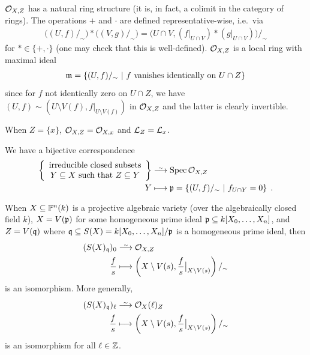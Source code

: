 \documentclass[a4paper,parskip=half,numbers=enddot, DIV=12]{scrreprt}
\begin{document}
    $\mathcal{O}_{X,Z}$ has a natural ring structure (it is, in fact, a colimit in the category of rings). The operations $+$ and $\cdot$ are defined representative-wise, i.e.\ via 
    \begin{align*}
        \big((U,f)/_\sim\big) * \big((V,g)/_\sim\big) = \big(U\cap V, (f|_{U\cap V})* (g|_{U\cap V})\big)/_\sim
    \end{align*}
    for $*\in\{+,\cdot\}$ (one may check that this is well-defined). $\mathcal{O}_{X,Z}$ is a local ring with maximal ideal
    \begin{align*}
        \mathfrak{m} = \left\{(U,f)/_\sim \ \middle|\  f\text{ vanishes identically on }U\cap Z\right\}
    \end{align*}
    since for $f$ not identically zero on $U\cap Z$, we have $(U,f)\sim\left(U\setminus V(f),f|_{U\setminus V(f)}\right)$ in $\mathcal{O}_{X,Z}$ and the latter is clearly invertible.
\begin{prop}
    \begin{alphanumerate}
    \item {}
        When $Z=\{x\}$, $\mathcal{O}_{X,Z} = \mathcal{O}_{X,x}$ and $\mathcal{L}_Z = \mathcal{L}_x$.
    \item   
	    We have a bijective correspondence
        \begin{align*}
	        \left\{
	        \begin{array}{c}
		        \text{irreducible closed subsets}\\
		        Y\subseteq X\text{ such that }Z\subseteq Y
	        \end{array}\right\}&\isomorphism\Spec \Oo_{X,Z}\\
            Y&\longmapsto \pp = \left\{(U,f)/_\sim\st f_{U\cap Y} = 0\right\}\;.
        \end{align*}
    \item 
        When $X\subseteq \mathbb{P}^n(k)$ is a projective algebraic variety (over the algebraically closed field $k$), $X=V(\mathfrak{p})$ for some homogeneous prime ideal $\mathfrak{p}\subseteq k[X_0,\ldots,X_n]$, and $Z= V(\mathfrak{q})$ where $\mathfrak{q}\subseteq S(X) = k[X_0,\ldots, X_n]/\mathfrak{p}$ is a homogeneous prime ideal, then
        \begin{align*}
            (S(X)_\qq)_0 &\isomorphism \Oo_{X,Z}\\
            \frac{f}{s} &\longmapsto \left(X\setminus V(s) , \frac{f}{s}\big|_{X\setminus V(s)}\right)/_\sim
           \end{align*}
           is an isomorphism. More generally,
           \begin{align*}
            (S(X)_\qq)_\ell &\isomorphism \Oo_X(\ell)_Z\\
            \frac{f}{s} &\longmapsto \left(X\setminus V(s) , \frac{f}{s}\big|_{X\setminus V(s)}\right)/_\sim
        \end{align*}
        is an isomorphism for all $\ell\in \mathbb{Z}$.
    \end{alphanumerate}
\end{prop}
\end{document}
